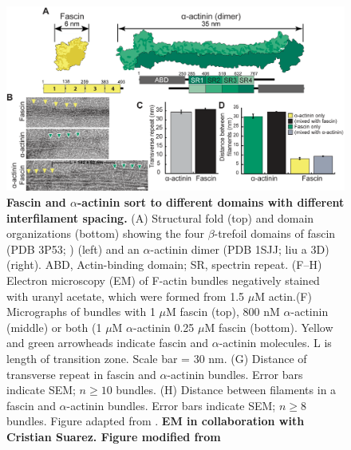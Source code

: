 \begin{figure}
\centering
\includegraphics[width=14cm]{img/ch03/Thesis_EM_fig.png}
\caption[Fascin and \texorpdfstring{$\alpha$}{alpha}-actinin sort to different domains with different interfilament spacing.]{\textbf{Fascin and $\alpha$-actinin sort to different domains with different interfilament spacing.} (A) Structural fold (top) and domain organizations (bottom) showing the four $\beta$-trefoil domains of fascin (PDB 3P53; \citep{jansen_mechanism_2011}) (left) and an $\alpha$-actinin dimer (PDB 1SJJ; {liu a 3D}) (right). ABD, Actin-binding domain; SR, spectrin repeat. (F–H) Electron microscopy (EM) of F-actin bundles negatively stained with uranyl acetate, which were formed from 1.5 $\mu$M actin.(F) Micrographs of bundles with 1 $\mu$M fascin (top), 800 nM $\alpha$-actinin (middle) or both (1 $\mu$M $\alpha$-actinin 0.25 $\mu$M fascin (bottom). Yellow and green arrowheads indicate fascin and $\alpha$-actinin molecules. L is length of transition zone. Scale bar = 30 nm. (G) Distance of transverse repeat in fascin and $\alpha$-actinin bundles. Error bars indicate SEM; $n\geq10$ bundles. (H) Distance between filaments in a fascin and $\alpha$-actinin bundles. Error bars indicate SEM; $n\geq8$ bundles. Figure adapted from \citep{winkelman_fascin-_2016}. \textbf{EM in collaboration with Cristian Suarez. Figure modified from \citep{winkelman_fascin-_2016}}}
\label{fig:em_fascin_aact}
\end{figure}

